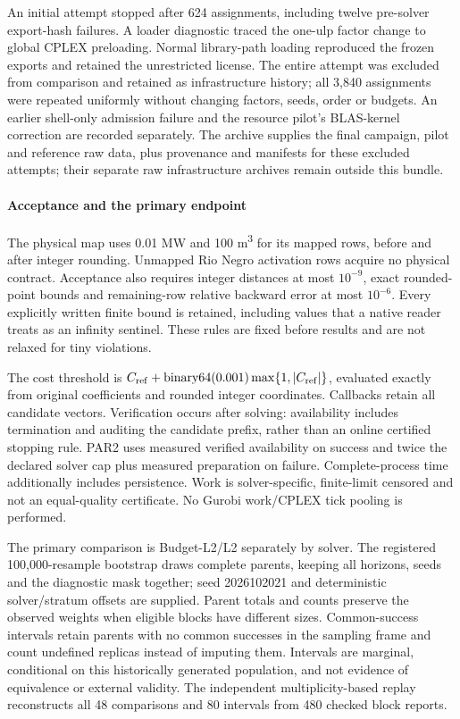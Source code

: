 An initial attempt stopped after 624 assignments, including twelve pre-solver
export-hash failures. A loader diagnostic traced the one-ulp factor change to
global CPLEX preloading. Normal library-path loading reproduced the frozen
exports and retained the unrestricted license. The entire attempt was excluded
from comparison and retained as infrastructure history; all 3,840 assignments
were repeated uniformly without changing factors, seeds, order or budgets.
An earlier shell-only admission failure and the resource pilot's BLAS-kernel
correction are recorded separately. The archive supplies the final campaign,
pilot and reference raw data, plus provenance and manifests for these excluded
attempts; their separate raw infrastructure archives remain outside this bundle.

\paragraph{Acceptance and the primary endpoint}
The physical map uses 0.01 MW and 100 m\textsuperscript{3} for its mapped rows,
before and after integer rounding. Unmapped Rio Negro activation rows acquire
no physical contract. Acceptance also requires integer distances at most
$10^{-9}$, exact rounded-point bounds and remaining-row relative backward error
at most $10^{-6}$. Every explicitly written finite bound is retained, including
values that a native reader treats as an infinity sentinel. These rules are
fixed before results and are not relaxed for tiny violations.

The cost threshold is
$C_{\rm ref}+\operatorname{binary64}(0.001)\max\{1,|C_{\rm ref}|\}$,
evaluated exactly from original coefficients and rounded integer coordinates.
Callbacks retain all candidate vectors. Verification occurs after solving:
availability includes termination and auditing the candidate prefix, rather
than an online certified stopping rule. PAR2 uses measured verified availability
on success and twice the declared solver cap plus measured preparation on
failure. Complete-process time additionally includes persistence. Work is
solver-specific, finite-limit censored and not an equal-quality certificate.
No Gurobi work/CPLEX tick pooling is performed.

The primary comparison is Budget-L2/L2 separately by solver. The registered
100,000-resample bootstrap draws complete parents, keeping all horizons,
seeds and the diagnostic mask together; seed 2026102021 and deterministic
solver/stratum offsets are supplied. Parent totals and counts preserve the
observed weights when eligible blocks have different sizes. Common-success
intervals retain parents with no common successes in the sampling frame and
count undefined replicas instead of imputing them. Intervals are marginal,
conditional on this historically generated population, and not evidence of
equivalence or external validity. The independent multiplicity-based replay
reconstructs all 48 comparisons and 80 intervals from 480 checked block reports.

